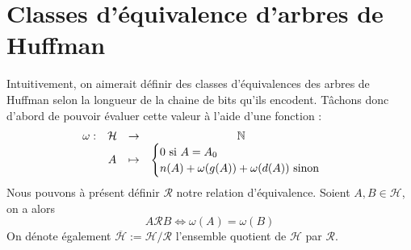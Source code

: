 \documentclass[a4paper, 12pt]{article}
\let\iff\Longleftrightarrow
\begin{document}
\section{Classes d'équivalence d'arbres de Huffman}
Intuitivement, on aimerait définir des classes d'équivalences des arbres de Huffman selon la longueur de la chaine de bits qu'ils encodent. Tâchons donc d'abord de pouvoir évaluer cette valeur à l'aide d'une fonction :
$$
\begin{matrix}
\omega: &\mathcal{H} &\rightarrow &\mathbb{N} \\
&A &\mapsto &{\begin{cases}
	0 \text{ si } A = A_0 \\    
	n(A)+\omega(g(A))+\omega(d(A)) \text{ sinon}
\end{cases}}
\end{matrix} \\
$$
Nous pouvons à présent définir $\mathcal{R}$ notre relation d'équivalence. Soient $A, B \in \mathcal{H}$, on a alors
$$
A \mathcal{R} B \iff \omega(A) = \omega(B)
$$
On dénote également $\overline{\mathcal{H}} := \mathcal{H}/\mathcal{R}$ l'ensemble quotient de $\mathcal{H}$ par $\mathcal{R}$.
\end{document}
